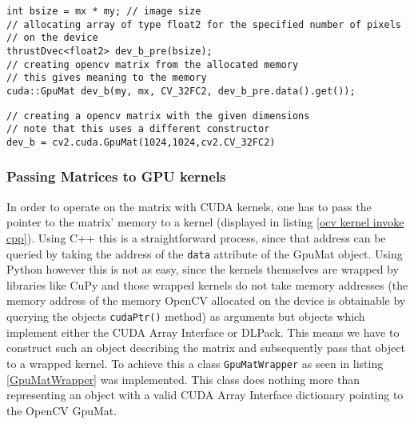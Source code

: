 \documentclass[english,11pt,a4paper,table]{article} %
\begin{document}
\begin{minipage}[t]{.49\textwidth}
	\begin{verbatim}
int bsize = mx * my; // image size
// allocating array of type float2 for the specified number of pixels 
// on the device
thrustDvec<float2> dev_b_pre(bsize);
// creating opencv matrix from the allocated memory
// this gives meaning to the memory
cuda::GpuMat dev_b(my, mx, CV_32FC2, dev_b_pre.data().get());
\end{verbatim}
\end{minipage}\hfill%
\begin{minipage}[t]{.49\textwidth}
	\begin{verbatim}
// creating a opencv matrix with the given dimensions
// note that this uses a different constructor
dev_b = cv2.cuda.GpuMat(1024,1024,cv2.CV_32FC2)
\end{verbatim}
\end{minipage}%

\subsubsection{Passing Matrices to GPU kernels}

In order to operate on the matrix with CUDA kernels, one has to pass the pointer to the matrix' memory to a kernel (displayed in listing \ref{ocv kernel invoke cpp}).
Using C++ this is a straightforward process, since that address can be queried by taking the address of the \texttt{data} attribute of the GpuMat object. 
Using Python however this is not as easy, since the kernels themselves are wrapped by libraries like CuPy and those wrapped kernels do not take memory addresses (the memory address of the memory OpenCV allocated on the device is obtainable by querying the objects \texttt{cudaPtr()} method) as arguments but objects which implement either the CUDA Array Interface or DLPack.
This means we have to construct such an object describing the matrix and subsequently pass that object to a wrapped kernel.
To achieve this a class \texttt{GpuMatWrapper} as seen in listing \ref{GpuMatWrapper} was implemented.
This class does nothing more than representing an object with a valid CUDA Array Interface dictionary pointing to the OpenCV GpuMat. 
\end{document}
